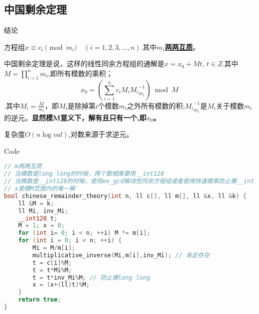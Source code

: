 \subsection{中国剩余定理}
\par \large{结论}
\par 方程组$x \equiv c_i \pmod{m_i} \quad (i=1, 2, 3, \ldots, n)$.其中$m_i$\underline{\textbf{两两互质}}。
\par 中国剩余定理是说，这样的线性同余方程组的通解是$x=x_0+Mt, \, t \in Z$.其中$M=\prod\limits_{i=1}^{n}m_i$,即所有模数的乘积；$$x_0={
	\left(
		\sum\limits_{i=1}^{n}
		c_i M_i {M_i}_{m_i}^{-1} 
	\right) \bmod M
}$$.其中$M_i=\frac{M}{m_i}$，即$M_i$是除掉第$i$个模数$m_i$之外所有模数的积;${M_i}_{m_i}^{-1}$是$M_i$关于模数$m_i$的逆元。\textbf{显然模M意义下，解有且只有一个,即$x_0$。}
\par 复杂度$O(n\log{val})$,对数来源于求逆元。
\par \large{Code}
\begin{lstlisting}[language={c++}]
// m两两互质
// 当模数是long long的时候，两个数相乘要用__int128
// 当模数是__int128的时候，使用ex_gcd解线性同余方程组或者使用快速模乘防止爆__int128
// x是模M范围内的唯一解
bool chinese_remainder_theory(int n, ll c[], ll m[], ll &x, ll &k) {
	ll &M = k;
	ll Mi, inv_Mi;
	__int128 t;
	M = 1; x = 0;
	for (int i= 0; i < n; ++i) M *= m[i];
	for (int i = 0; i < n; ++i) {
		Mi = M/m[i];
		multiplicative_inverse(Mi,m[i],inv_Mi); // 肯定存在
		t = c[i]%M;
		t = t*Mi%M;
		t = t*inv_Mi%M; // 防止爆long long
		x = (x+(ll)t)%M;
	}
	return true;
}
\end{lstlisting}